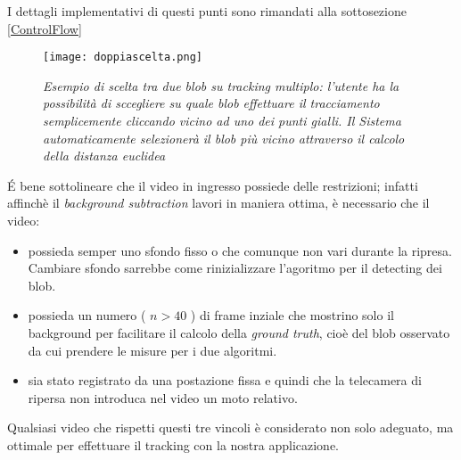 I dettagli implementativi di questi punti sono rimandati alla sottosezione  \ref{ControlFlow}

\begin{figure}[hb]
\centering
	\texttt{[image: doppiascelta.png]}
\caption[Esempio di scelta tra due blob]{\textit{Esempio di scelta tra due blob su tracking multiplo: l'utente ha la possibilità di sccegliere su quale blob effettuare il tracciamento semplicemente cliccando vicino ad uno dei punti gialli. Il Sistema automaticamente selezionerà il blob più vicino attraverso il calcolo della distanza euclidea}\label{fig:scelta2blob}}
\end{figure}


\'E bene sottolineare che il video in ingresso possiede delle restrizioni; infatti affinchè il \textit{background subtraction} lavori in maniera ottima, è necessario che il video:
\begin{itemize}
 \item possieda semper uno sfondo fisso o che comunque non vari durante la ripresa. Cambiare sfondo sarrebbe come rinizializzare l'agoritmo per il detecting dei blob.
\item possieda un numero ( $n > 40 $ ) di frame inziale che mostrino solo il background per facilitare il calcolo della \textit{ground truth}, cioè del blob osservato da cui prendere le misure per i due algoritmi.
\item sia stato registrato da una postazione fissa e quindi che la telecamera di ripersa non introduca nel video un moto relativo.
 \end{itemize}

Qualsiasi video che rispetti questi tre vincoli è considerato non solo adeguato, ma ottimale per effettuare il tracking con la nostra applicazione.







